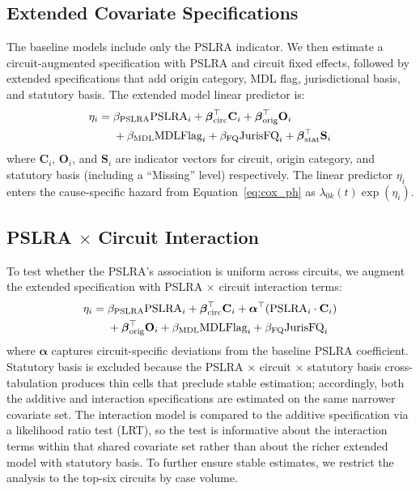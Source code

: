 \subsection{Extended Covariate Specifications}

The baseline models include only the PSLRA indicator. We
then estimate a circuit-augmented specification with PSLRA
and circuit fixed effects, followed by extended
specifications that add origin category, MDL flag,
jurisdictional basis, and statutory basis. The extended
model linear predictor is:
\begin{align}
\eta_i ={}& \beta_{\text{PSLRA}} \text{PSLRA}_i + \boldsymbol{\beta}_{\text{circ}}^\top \mathbf{C}_i + \boldsymbol{\beta}_{\text{orig}}^\top \mathbf{O}_i \notag \\
&+ \beta_{\text{MDL}} \text{MDLFlag}_i + \beta_{\text{FQ}} \text{JurisFQ}_i + \boldsymbol{\beta}_{\text{stat}}^\top \mathbf{S}_i
\end{align}
where $\mathbf{C}_i$, $\mathbf{O}_i$, and $\mathbf{S}_i$ are indicator vectors for circuit, origin category, and statutory basis (including a ``Missing'' level) respectively. The linear predictor $\eta_i$ enters the cause-specific hazard from Equation~\ref{eq:cox_ph} as $\lambda_{0k}(t)\exp(\eta_i)$.

\subsection{PSLRA \texorpdfstring{$\times$}{x} Circuit Interaction}

To test whether the PSLRA's association is uniform across circuits, we augment the extended specification with PSLRA $\times$ circuit interaction terms:
\begin{align}
\eta_i ={}& \beta_{\text{PSLRA}} \text{PSLRA}_i + \boldsymbol{\beta}_{\text{circ}}^\top \mathbf{C}_i + \boldsymbol{\alpha}^\top (\text{PSLRA}_i \cdot \mathbf{C}_i) \notag \\
&+ \boldsymbol{\beta}_{\text{orig}}^\top \mathbf{O}_i + \beta_{\text{MDL}} \text{MDLFlag}_i + \beta_{\text{FQ}} \text{JurisFQ}_i
\end{align}
where $\boldsymbol{\alpha}$ captures circuit-specific deviations from the baseline PSLRA coefficient. Statutory basis is excluded because the PSLRA $\times$ circuit $\times$ statutory basis cross-tabulation produces thin cells that preclude stable estimation; accordingly, both the additive and interaction specifications are estimated on the same narrower covariate set. The interaction model is compared to the additive specification via a likelihood ratio test (LRT), so the test is informative about the interaction terms within that shared covariate set rather than about the richer extended model with statutory basis. To further ensure stable estimates, we restrict the analysis to the top-six circuits by case volume.

